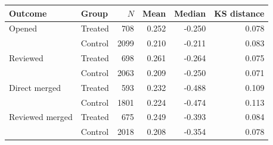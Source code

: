 \small
\begin{tabular}{llrrrr}
\toprule
Outcome & Group & $N$ & Mean & Median & KS distance \\
\midrule
Opened & Treated & 708 & 0.252 & -0.250 & 0.078 \\
       & Control & 2099 & 0.210 & -0.211 & 0.083 \\
Reviewed & Treated & 698 & 0.261 & -0.264 & 0.075 \\
         & Control & 2063 & 0.209 & -0.250 & 0.071 \\
Direct merged & Treated & 593 & 0.232 & -0.488 & 0.109 \\
              & Control & 1801 & 0.224 & -0.474 & 0.113 \\
Reviewed merged & Treated & 675 & 0.249 & -0.393 & 0.084 \\
                & Control & 2018 & 0.208 & -0.354 & 0.078 \\
\bottomrule
\end{tabular}
